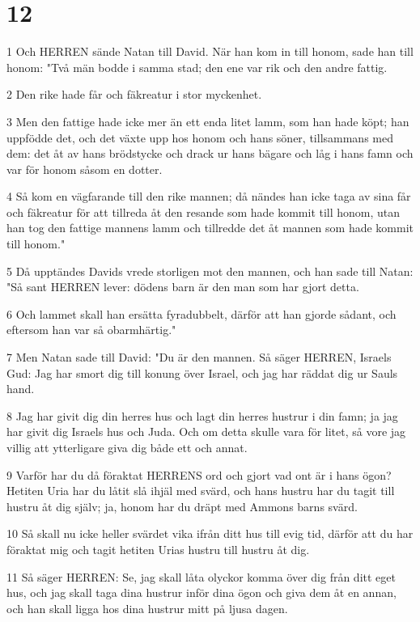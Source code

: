 \chapter{12}

\par 1 Och HERREN sände Natan till David. När han kom in till honom, sade han till honom: "Två män bodde i samma stad; den ene var rik och den andre fattig.
\par 2 Den rike hade får och fäkreatur i stor myckenhet.
\par 3 Men den fattige hade icke mer än ett enda litet lamm, som han hade köpt; han uppfödde det, och det växte upp hos honom och hans söner, tillsammans med dem: det åt av hans brödstycke och drack ur hans bägare och låg i hans famn och var för honom såsom en dotter.
\par 4 Så kom en vägfarande till den rike mannen; då nändes han icke taga av sina får och fäkreatur för att tillreda åt den resande som hade kommit till honom, utan han tog den fattige mannens lamm och tillredde det åt mannen som hade kommit till honom."
\par 5 Då upptändes Davids vrede storligen mot den mannen, och han sade till Natan: "Så sant HERREN lever: dödens barn är den man som har gjort detta.
\par 6 Och lammet skall han ersätta fyradubbelt, därför att han gjorde sådant, och eftersom han var så obarmhärtig."
\par 7 Men Natan sade till David: "Du är den mannen. Så säger HERREN, Israels Gud: Jag har smort dig till konung över Israel, och jag har räddat dig ur Sauls hand.
\par 8 Jag har givit dig din herres hus och lagt din herres hustrur i din famn; ja jag har givit dig Israels hus och Juda. Och om detta skulle vara för litet, så vore jag villig att ytterligare giva dig både ett och annat.
\par 9 Varför har du då föraktat HERRENS ord och gjort vad ont är i hans ögon? Hetiten Uria har du låtit slå ihjäl med svärd, och hans hustru har du tagit till hustru åt dig själv; ja, honom har du dräpt med Ammons barns svärd.
\par 10 Så skall nu icke heller svärdet vika ifrån ditt hus till evig tid, därför att du har föraktat mig och tagit hetiten Urias hustru till hustru åt dig.
\par 11 Så säger HERREN: Se, jag skall låta olyckor komma över dig från ditt eget hus, och jag skall taga dina hustrur inför dina ögon och giva dem åt en annan, och han skall ligga hos dina hustrur mitt på ljusa dagen.
